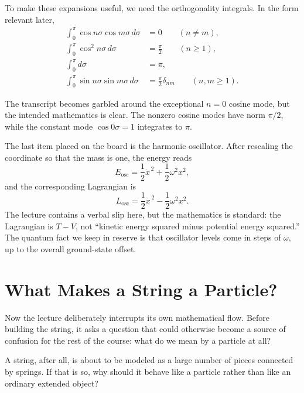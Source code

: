 To make these expansions useful, we need the orthogonality integrals. In the form relevant later,
\begin{align}
\int_0^\pi \cos n\sigma \cos m\sigma\,d\sigma &= 0 \qquad (n\neq m), \\
\int_0^\pi \cos^2 n\sigma\,d\sigma &= \frac{\pi}{2} \qquad (n\geq 1), \\
\int_0^\pi d\sigma &= \pi, \\
\int_0^\pi \sin n\sigma \sin m\sigma\,d\sigma &= \frac{\pi}{2}\delta_{nm} \qquad (n,m\geq 1).
\end{align}

\begin{remark}
The transcript becomes garbled around the exceptional \(n=0\) cosine mode, but the intended mathematics is clear. The nonzero cosine modes have norm \(\pi/2\), while the constant mode \(\cos 0\sigma=1\) integrates to \(\pi\).
\end{remark}

The last item placed on the board is the harmonic oscillator. After rescaling the coordinate so that the mass is one, the energy reads
\begin{equation}
E_{\mathrm{osc}}=\frac{1}{2}\dot x^{\,2}+\frac{1}{2}\omega^2 x^2,
\end{equation}
and the corresponding Lagrangian is
\begin{equation}
L_{\mathrm{osc}}=\frac{1}{2}\dot x^{\,2}-\frac{1}{2}\omega^2 x^2.
\end{equation}
The lecture contains a verbal slip here, but the mathematics is standard: the Lagrangian is \(T-V\), not ``kinetic energy squared minus potential energy squared.'' The quantum fact we keep in reserve is that oscillator levels come in steps of \(\omega\), up to the overall ground-state offset.

\section{What Makes a String a Particle?}

Now the lecture deliberately interrupts its own mathematical flow. Before building the string, it asks a question that could otherwise become a source of confusion for the rest of the course: what do we mean by a particle at all?

A string, after all, is about to be modeled as a large number of pieces connected by springs. If that is so, why should it behave like a particle rather than like an ordinary extended object?

